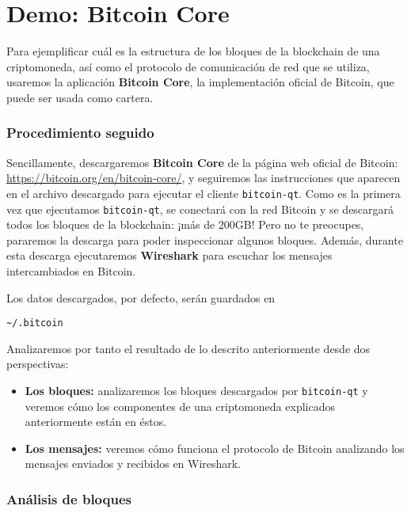 \documentclass[10pt, a4paper]{article}
\let\Oldpart\part
\newcommand{\parttitle}{}
\renewcommand{\part}[1]{\pagebreak\Oldpart{#1}\renewcommand{\parttitle}{#1}}
\theoremstyle{theorem-style}
\theoremstyle{theorem-style}
\theoremstyle{definition-style}
\theoremstyle{remark-style}
\theoremstyle{example-style}
\theoremstyle{definition-style}
\theoremstyle{remark-style}
\begin{document}
\pagebreak
\part{Demo: Bitcoin Core}\label{demo-wireshark}

Para ejemplificar cuál es la estructura de los bloques de la blockchain de una criptomoneda, así como el protocolo de comunicación de red que se utiliza, usaremos la aplicación \textbf{Bitcoin Core}, la implementación oficial de Bitcoin, que puede ser usada como cartera.

\section{Procedimiento seguido}

Sencillamente, descargaremos \textbf{Bitcoin Core} de la página web oficial de Bitcoin: \url{https://bitcoin.org/en/bitcoin-core/}, y seguiremos las instrucciones que aparecen en el archivo descargado para ejecutar el cliente \texttt{bitcoin-qt}. Como es la primera vez que ejecutamos \texttt{bitcoin-qt}, se conectará con la red Bitcoin y se descargará todos los bloques de la blockchain: ¡más de 200GB! Pero no te preocupes, pararemos la descarga para poder inspeccionar algunos bloques. Además, durante esta descarga ejecutaremos \textbf{Wireshark} para escuchar los mensajes intercambiados en Bitcoin.

Los datos descargados, por defecto, serán guardados en

\hspace{1cm}\texttt{\textasciitilde/.bitcoin}

Analizaremos por tanto el resultado de lo descrito anteriormente desde dos perspectivas:

\begin{itemize}
\def\labelenumi{\arabic{enumi}.}
\itemsep1pt\parskip0pt
\item
  \textbf{Los bloques:} analizaremos los bloques descargados por \texttt{bitcoin-qt} y veremos cómo los componentes de una criptomoneda explicados anteriormente están en éstos.
\item
  \textbf{Los mensajes:} veremos cómo funciona el protocolo de Bitcoin analizando los mensajes enviados y recibidos en Wireshark.
\end{itemize}

\section{Análisis de bloques}
\end{document}
